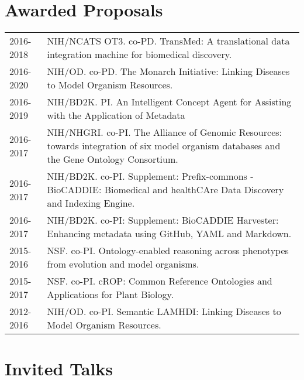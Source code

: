 \documentclass[11pt,fullpage]{article}
\begin{document}
\section*{Awarded Proposals}

\begin{longtable}{p{0.5in}|p{5.5in}}

2016-2018 & NIH/NCATS OT3. co-PD. TransMed: A translational data integration machine for biomedical discovery.\\

2016-2020 & NIH/OD. co-PD. The Monarch Initiative: Linking Diseases to Model Organism Resources. \\

2016-2019 & NIH/BD2K. PI. An Intelligent Concept Agent for Assisting with the Application of Metadata \\

2016-2017 & NIH/NHGRI. co-PI. The Alliance of Genomic Resources: towards integration of six model organism databases and the Gene Ontology Consortium.  \\

2016-2017 & NIH/BD2K. co-PI. Supplement: Prefix-commons - BioCADDIE: Biomedical and healthCAre Data Discovery and Indexing Engine.\\

2016-2017 & NIH/BD2K. co-PI: Supplement: BioCADDIE Harvester: Enhancing metadata using GitHub, YAML and Markdown. \\

2015-2016 & NSF. co-PI. Ontology-enabled reasoning across phenotypes from evolution and model organisms. \\

2015-2017 & NSF. co-PI. cROP: Common Reference Ontologies and Applications for Plant Biology. \\

2012-2016 & NIH/OD. co-PI. Semantic LAMHDI: Linking Diseases to Model Organism Resources. \\


\end{longtable}



\section*{Invited Talks}
\end{document}
